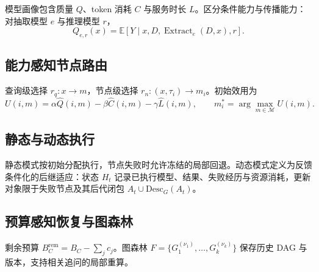\documentclass[review,12pt]{elsarticle}
\begin{document}
模型画像包含质量 $Q$、token 消耗 $C$ 与服务时长 $L$。区分条件能力与传播能力：对抽取模型 $e$ 与推理模型 $r$，
\begin{equation}
Q_{e,r}(x)=\mathbb{E}\!\left[Y\mid x,D,\operatorname{Extract}_e(D,x),r\right].
\end{equation}

\subsection{能力感知节点路由}

查询级选择 $r_q:x\to m$，节点级选择 $r_n:(x,\tau_i)\to m_i$。初始效用为
\begin{equation}
U(i,m)=\alpha\widehat{Q}(i,m)-\beta\widehat{C}(i,m)-\gamma\widehat{L}(i,m),\qquad
m_i^{*}=\arg\max_{m\in\mathcal{M}} U(i,m).
\end{equation}

\subsection{静态与动态执行}

静态模式按初始分配执行，节点失败时允许冻结的局部回退。动态模式定义为反馈条件化的后继适应：状态 $H_t$ 记录已执行模型、结果、失败经历与资源消耗，更新对象限于失败节点及其后代闭包 $A_t\cup \mathrm{Desc}_G(A_t)$。

\subsection{预算感知恢复与图森林}

剩余预算 $B_C^{\mathrm{rem}}=B_C-\sum_j c_j$。图森林 $F=\{G_1^{(\nu_1)},\dots,G_k^{(\nu_k)}\}$ 保存历史 DAG 与版本，支持相关追问的局部重算。





\end{document}
